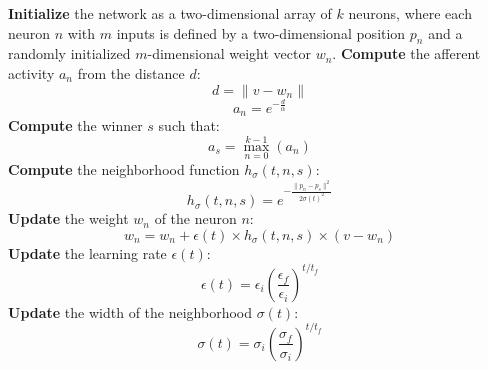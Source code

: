 \documentclass[runningheads]{llncs}
\begin{document}
\begin{algorithmic}[]
    \STATE
    \STATE \textbf{Initialize} the network as a two-dimensional array of $k$ neurons, where each neuron $n$ with $m$ inputs is defined by a two-dimensional position $p_n$ and a randomly initialized $m$-dimensional weight vector $w_n$.
                \STATE \textbf{Compute} the afferent activity $a_n$ from the distance $d$:
                    \begin{equation}
                    \label{eq_euc-dist}
                        d = \|v - w_n\|
                    \end{equation}
                    \begin{equation}
                    \label{eq_gaussian}
                        a_n = e^{-\frac{d}{\alpha}}
                    \end{equation}
            \ENDFOR
        	\STATE \textbf{Compute} the winner $s$ such that:
            	\begin{equation}
            	\label{eq_max_activity}
                    a_s = \max_{n=0}^{k-1} \left( a_n \right)
                \end{equation}
            	\STATE \textbf{Compute} the neighborhood function $h_\sigma(t,n,s)$:
                \begin{equation}
                	h_{\sigma}(t,n,s) = e^{-\frac{\|p_n - p_s\|^2}{2{\sigma}(t)^2}}
                \end{equation}
                \STATE \textbf{Update} the weight $w_n$ of the neuron $n$:
                \begin{equation}
                	w_n = w_n + \epsilon(t) \times h_{\sigma}(t,n,s) \times (v - w_n)
                \end{equation}
            \ENDFOR
        \ENDFOR
        \STATE \textbf{Update} the learning rate $\epsilon(t)$:
        \begin{equation}
        	\epsilon(t) = \epsilon_i \left(\frac{\epsilon_f}{\epsilon_i}\right)^{t/t_f}
        \end{equation}
        \STATE \textbf{Update} the width of the neighborhood $\sigma(t)$:
        \begin{equation}
        	\sigma(t) = \sigma_i \left(\frac{\sigma_f}{\sigma_i}\right)^{t/t_f}
        \end{equation}
	\ENDFOR
\end{algorithmic}
\end{document}
